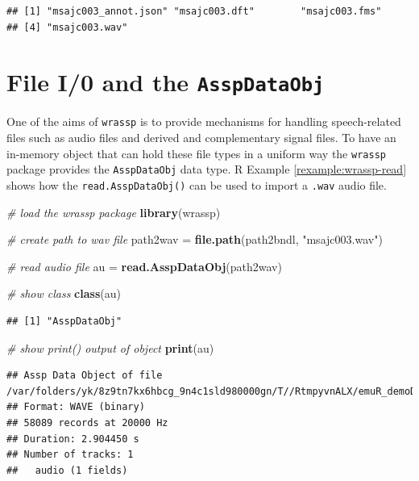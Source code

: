 \documentclass[]{book}
\newenvironment{Shaded}{\begin{snugshade}}{\end{snugshade}}
\newcommand{\CommentTok}[1]{\textcolor[rgb]{0.56,0.35,0.01}{\textit{#1}}}
\newcommand{\KeywordTok}[1]{\textcolor[rgb]{0.13,0.29,0.53}{\textbf{#1}}}
\newcommand{\NormalTok}[1]{#1}
\newcommand{\StringTok}[1]{\textcolor[rgb]{0.31,0.60,0.02}{#1}}
\theoremstyle{definition}
\theoremstyle{definition}
\theoremstyle{definition}
\theoremstyle{remark}
\begin{document}
\begin{verbatim}
## [1] "msajc003_annot.json" "msajc003.dft"        "msajc003.fms"       
## [4] "msajc003.wav"
\end{verbatim}

\hypertarget{file-i0-and-the-asspdataobj}{%
\section{\texorpdfstring{File I/0 and the
\texttt{AsspDataObj}}{File I/0 and the AsspDataObj}}\label{file-i0-and-the-asspdataobj}}

One of the aims of \texttt{wrassp} is to provide mechanisms for handling
speech-related files such as audio files and derived and complementary
signal files. To have an in-memory object that can hold these file types
in a uniform way the \texttt{wrassp} package provides the
\texttt{AsspDataObj} data type. R Example \ref{rexample:wrassp-read}
shows how the \texttt{read.AsspDataObj()} can be used to import a
\texttt{.wav} audio file.

\begin{Shaded}
\begin{Highlighting}[]
\CommentTok{# load the wrassp package}
\KeywordTok{library}\NormalTok{(wrassp)}

\CommentTok{# create path to wav file}
\NormalTok{path2wav =}\StringTok{ }\KeywordTok{file.path}\NormalTok{(path2bndl, }\StringTok{"msajc003.wav"}\NormalTok{)}

\CommentTok{# read audio file}
\NormalTok{au =}\StringTok{ }\KeywordTok{read.AsspDataObj}\NormalTok{(path2wav)}

\CommentTok{# show class}
\KeywordTok{class}\NormalTok{(au)}
\end{Highlighting}
\end{Shaded}

\begin{verbatim}
## [1] "AsspDataObj"
\end{verbatim}

\begin{Shaded}
\begin{Highlighting}[]
\CommentTok{# show print() output of object}
\KeywordTok{print}\NormalTok{(au)}
\end{Highlighting}
\end{Shaded}

\begin{verbatim}
## Assp Data Object of file /var/folders/yk/8z9tn7kx6hbcg_9n4c1sld980000gn/T//RtmpyvnALX/emuR_demoData/ae_emuDB/0000_ses/msajc003_bndl/msajc003.wav.
## Format: WAVE (binary)
## 58089 records at 20000 Hz
## Duration: 2.904450 s
## Number of tracks: 1 
##   audio (1 fields)
\end{verbatim}
\end{document}
